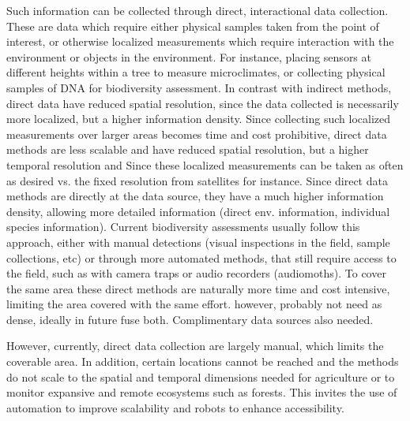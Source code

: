Such information can be collected through direct, interactional data collection. These are data which require either physical samples taken from the point of interest, or otherwise localized measurements which require interaction with the environment or objects in the environment. For instance, placing sensors at different heights within a tree to measure microclimates, or collecting physical samples of DNA for biodiversity assessment. In contrast with indirect methods, direct data have reduced spatial resolution, since the data collected is necessarily  more localized, but a higher information density. Since collecting such localized measurements over larger areas becomes time and cost prohibitive, direct data methods are less scalable and have reduced spatial resolution, but  a higher temporal resolution and Since these localized measurements can be taken as often as desired vs. the fixed resolution from satellites for instance. Since direct data methods are directly at the data source, they have a much higher information density, allowing more detailed information (direct env. information, individual species information).
Current biodiversity assessments usually follow this approach, either with manual detections (visual inspections in the field, sample collections, etc) or through more automated methods, that still require access to the field, such as with camera traps or audio recorders (audiomoths).
To cover the same area these direct methods are naturally more time and cost intensive, limiting the area covered with the same effort. 
however, probably not need as dense, ideally in future fuse both.
 Complimentary data sources also needed. 

 However, currently, direct data collection are largely manual, which limits the coverable area. In addition, certain locations cannot be reached and the methods do not scale to the spatial and temporal dimensions needed for agriculture or to monitor expansive and remote ecosystems such as forests. This invites the use of automation to improve scalability and robots to enhance accessibility. %
 

